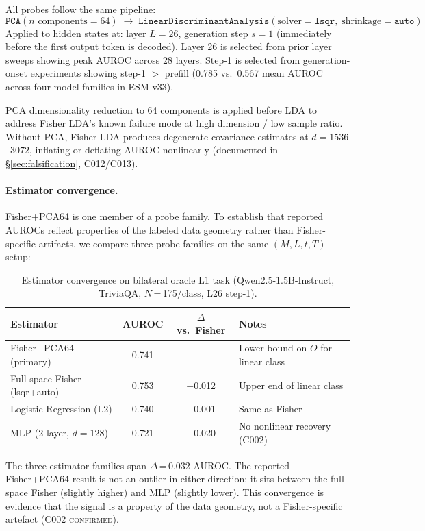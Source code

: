 \documentclass[11pt]{article}
\begin{document}
All probes follow the same pipeline:
\[
\texttt{PCA}(n\_\text{components}=64) \;\to\; \texttt{LinearDiscriminantAnalysis}
(\text{solver}=\texttt{lsqr},\; \text{shrinkage}=\texttt{auto})
\]
Applied to hidden states at: layer $L=26$, generation step $s=1$ (immediately before
the first output token is decoded). Layer 26 is selected from prior layer sweeps showing
peak AUROC across 28 layers. Step-1 is selected from generation-onset experiments showing
step-1 $>$ prefill (0.785 vs.\ 0.567 mean AUROC across four model families in ESM v33).

PCA dimensionality reduction to 64 components is applied before LDA to address Fisher
LDA's known failure mode at high dimension / low sample ratio. Without PCA, Fisher LDA
produces degenerate covariance estimates at $d=1536$--$3072$, inflating or deflating AUROC
nonlinearly (documented in \S\ref{sec:falsification}, C012/C013).

\paragraph{Estimator convergence.}
Fisher+PCA64 is one member of a probe family. To establish that reported AUROCs reflect
properties of the labeled data geometry rather than Fisher-specific artifacts, we compare
three probe families on the same $(M, L, t, T)$ setup:

\begin{table}[h!]
\centering
\caption{Estimator convergence on bilateral oracle L1 task
  (Qwen2.5-1.5B-Instruct, TriviaQA, $N$\,=\,175/class, L26 step-1).}
\begin{tabular}{lccl}
\toprule
Estimator & AUROC & $\Delta$ vs.\ Fisher & Notes \\
\midrule
Fisher+PCA64 (primary) & 0.741 & --- & Lower bound on $O$ for linear class \\
Full-space Fisher (lsqr+auto) & 0.753 & $+$0.012 & Upper end of linear class \\
Logistic Regression (L2) & 0.740 & $-$0.001 & Same as Fisher \\
MLP (2-layer, $d=128$) & 0.721 & $-$0.020 & No nonlinear recovery (C002) \\
\bottomrule
\end{tabular}
\end{table}

The three estimator families span $\Delta$\,=\,0.032 AUROC. The reported Fisher+PCA64
result is not an outlier in either direction; it sits between the full-space Fisher
(slightly higher) and MLP (slightly lower). This convergence is evidence that the
signal is a property of the data geometry, not a Fisher-specific artefact (C002
\textsc{confirmed}).
\end{document}
